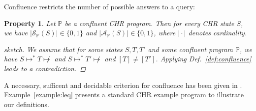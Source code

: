 \documentclass[acmtocl]{acmtrans2m}
\newtheorem{property}[theorem]{Property}
\newcommand{\bbP}{\ensuremath{\mathbb{P}}}
\newcommand{\cA}{\ensuremath{\mathcal{A}}}
\newcommand{\cS}{\ensuremath{\mathcal{S}}}
\newcommand{\der}{\ensuremath{\mapsto}}
\newcommand{\nder}{\ensuremath{\not\mapsto}}
\begin{document}
Confluence restricts the number of possible answers to a query:

\begin{property}\label{prop:confluence-answers}
Let $\bbP$ be a confluent CHR program. Then for every CHR state $S$, we have
$|\cS_{\bbP}(S)|\in\{0,1\}$ and $|\cA_{\bbP}(S)|\in\{0,1\}$, where
$\mid\cdot\mid$ denotes cardinality.
\begin{proof}[sketch]
We assume that for some states $S,T,T'$ and some confluent program $\bbP$, we
have $S\der^* T\nder$ and $S\der^* T'\nder$ and $[T]\neq[T']$. Applying
Def.~\ref{def:confluence} leads to a contradiction.
\end{proof}
\end{property}

A necessary, sufficent and decidable criterion for confluence has been given in
. Example~\ref{example:leq} presents a
standard CHR example program to illustrate our definitions.
\end{document}
